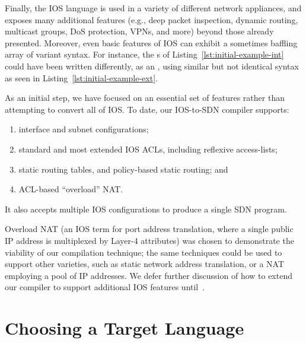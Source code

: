 Finally, the IOS language is
used in a variety of different network appliances, and exposes many additional
features (e.g., deep packet inspection, dynamic routing, multicast groups,
DoS protection, VPNs, and more) beyond those already presented.
Moreover, even basic features of IOS can exhibit a
sometimes baffling array of variant syntax. For instance, the s
of Listing~\ref{lst:initial-example-int} could have been written
differently, as an , using similar but not identical
syntax as seen in Listing~\ref{lst:initial-example-ext}.

As an initial step, we have focused on an essential set of
features rather than attempting to convert all of IOS. To date, our IOS-to-SDN
compiler supports:
\begin{enumerate}
\item interface and subnet configurations;
\item standard and most extended IOS ACLs, including reflexive access-lists;
\item static routing tables, and policy-based static routing; and
\item ACL-based ``overload'' NAT.
\end{enumerate}
It also accepts multiple IOS configurations to produce a single SDN program.

Overload NAT (an IOS term for port address translation, where a single public
IP address is multiplexed by Layer-4 attributes) was chosen to demonstrate the
viability of our compilation technique; the same techniques could be used to
support other varieties, such as static network address translation, or a NAT
employing a pool of IP addresses. We defer further discussion of how to extend our
compiler to support additional IOS features until~.




\section{Choosing a Target Language}
\label{sec:target}

